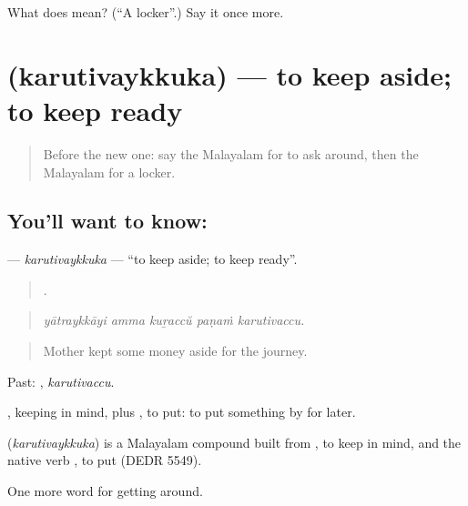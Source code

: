\begin{tcolorbox}[breakable,colback=teal!4,colframe=teal!35!black,title={Before you move on}]
What does  mean? (\textquotedblleft{}A locker\textquotedblright{}.) Say it once more.
\end{tcolorbox}
\section[\texorpdfstring{\ml{കരുതിവയ്ക്കുക} (karutivaykkuka)}{കരുതിവയ്ക്കുക (karutivaykkuka)}]{ (karutivaykkuka) — to keep aside; to keep ready}

\label{lesson:ML-C480-karutivaykkuka}



\begin{quote}
Before the new one: say the Malayalam for to ask around, then the Malayalam for a locker.
\end{quote}

\subsection*{You'll want to know: }
\textbf{} — \emph{karutivaykkuka} — \textquotedblleft{}to keep aside; to keep ready\textquotedblright{}.

\begin{quote}
    .
\end{quote}

\begin{quote}
\emph{yātraykkāyi amma kuṟaccŭ paṇaṁ karutivaccu.}
\end{quote}

\begin{quote}
Mother kept some money aside for the journey.
\end{quote}

Past: , \emph{karutivaccu}.

, keeping in mind, plus , to put: to put something by for later.

\begin{cousinweb}
\textbf{} (\emph{karutivaykkuka}) is a Malayalam compound built from , to keep in mind, and the native verb , to put (DEDR 5549).
\end{cousinweb}

\begin{grammarlens}[title={What you've built}]
One more word for getting around.
\end{grammarlens}

